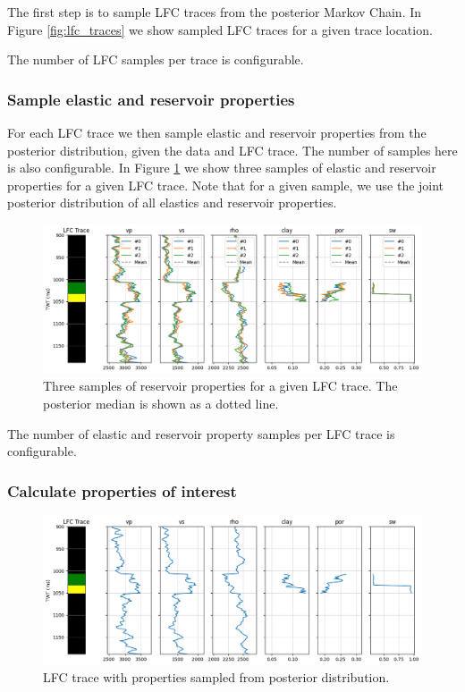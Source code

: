 \documentclass[note,screen,english,12pt,utf8]{nrdoc}
\begin{document}
The first step is to sample LFC traces from the posterior Markov Chain.
In Figure \ref{fig:lfc_traces} we show
sampled LFC traces for a given trace location.

The number of LFC samples per trace is configurable.

\subsubsection{Sample elastic and reservoir properties}
For each LFC trace we then sample elastic and reservoir properties
from the posterior distribution, given the data and LFC trace.
The number of samples here is also configurable. In Figure \ref{fig:sampled_properties}
we show three samples of elastic and reservoir properties for a given LFC trace. Note that
for a given sample, we use the joint posterior distribution of all elastics
and reservoir properties.
\begin{figure}[h]
    \centering
    \includegraphics[width=\textwidth]{figures/sampled_properties_with_mean_il57_xl62.png}
    \caption{Three samples of reservoir properties for a given LFC trace. The posterior median is shown as a dotted line.}
    \label{fig:sampled_properties}
\end{figure}

The number of elastic and reservoir property samples per LFC trace is configurable.

\subsubsection{Calculate properties of interest}

\begin{figure}[h]
    \centering
    \includegraphics[width=\textwidth]{figures/sampled_properties_il57_xl62.png}
    \caption{LFC trace with properties sampled from posterior distribution.}
    \label{fig:lfc_trace_and_properties}
\end{figure}
\end{document}
